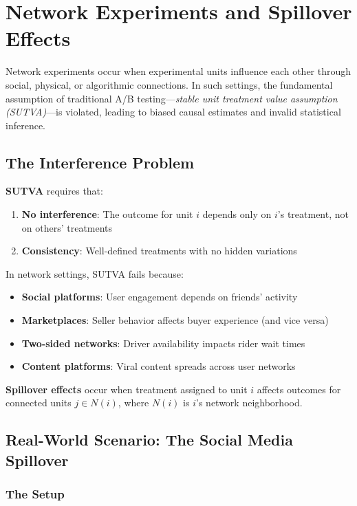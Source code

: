 \section{Network Experiments and Spillover Effects}

Network experiments occur when experimental units influence each other through social, physical, or algorithmic connections. In such settings, the fundamental assumption of traditional A/B testing---\textit{stable unit treatment value assumption (SUTVA)}---is violated, leading to biased causal estimates and invalid statistical inference.

\subsection{The Interference Problem}

\textbf{SUTVA} requires that:
\begin{enumerate}
    \item \textbf{No interference}: The outcome for unit $i$ depends only on $i$'s treatment, not on others' treatments
    \item \textbf{Consistency}: Well-defined treatments with no hidden variations
\end{enumerate}

In network settings, SUTVA fails because:
\begin{itemize}
    \item \textbf{Social platforms}: User engagement depends on friends' activity
    \item \textbf{Marketplaces}: Seller behavior affects buyer experience (and vice versa)
    \item \textbf{Two-sided networks}: Driver availability impacts rider wait times
    \item \textbf{Content platforms}: Viral content spreads across user networks
\end{itemize}

\textbf{Spillover effects} occur when treatment assigned to unit $i$ affects outcomes for connected units $j \in N(i)$, where $N(i)$ is $i$'s network neighborhood.

\subsection{Real-World Scenario: The Social Media Spillover}

\subsubsection{The Setup}

